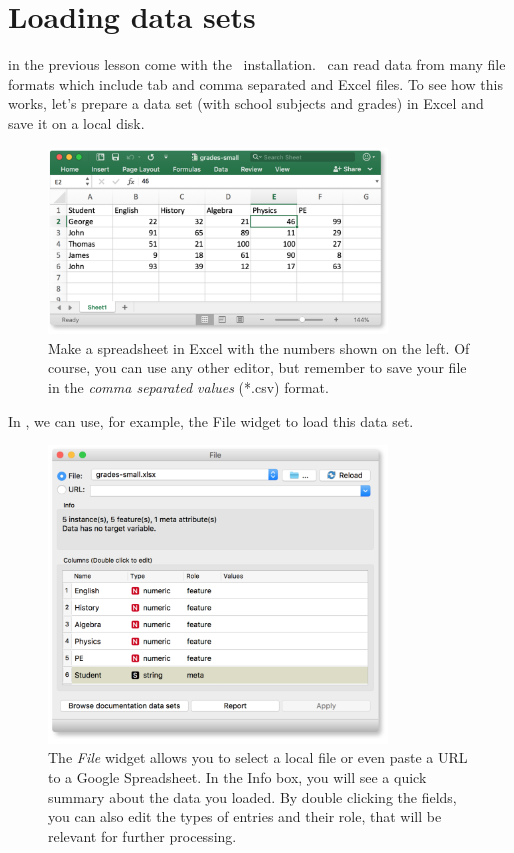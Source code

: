 \chapter{Loading data sets}
\label{ch:loading_data}

 in the previous lesson come with the \mutation\ installation. \mutation\ can read data from many file formats which include tab and comma separated and Excel files. To see how this works, let's prepare a data set (with school subjects and grades) in Excel and save it on a local disk.

\begin{figure}[h]
  \centering
  \includegraphics[width=90mm]{loading-fig1.png}%
  \caption{Make a spreadsheet in Excel with the numbers shown on the left. Of course, you can use any other editor, but remember to save your file in the \textit{comma separated values} (*.csv) format.}
  \label{fig:loading-fig1}
\end{figure}

In \mutation, we can use, for example, the File widget to load this data set.

\begin{figure}[h]
  \centering
  \includegraphics[width=90mm]{loading-fig2.png}%
  \caption{The \textit{File} widget allows you to select a local file or even paste a URL to a Google Spreadsheet. In the Info box, you will see a quick summary about the data you loaded. By double clicking the fields, you can also edit the types of entries and their role, that will be relevant for further processing.}
  \label{fig:loading-fig2}
\end{figure}

